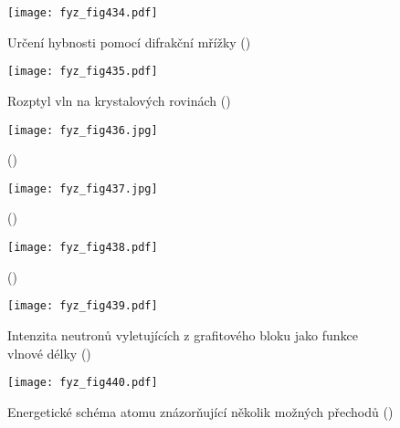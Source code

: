   \begin{figure}[ht!] %
    \centering
    \texttt{[image: fyz\_fig434.pdf]}
    \caption{Určení hybnosti pomocí difrakční mřížky
             (\cite[s.~513]{Feynman01})}
    \label{fyz:fig434}
  \end{figure}

  \begin{figure}[ht!] %
    \centering
    \texttt{[image: fyz\_fig435.pdf]}
    \caption{Rozptyl vln na krystalových rovinách
             (\cite[s.~514]{Feynman01})}
    \label{fyz:fig435}
  \end{figure}

  \begin{figure}[ht!] %
    \centering
    \texttt{[image: fyz\_fig436.jpg]}
    \caption{
             (\cite[s.~515]{Feynman01})}
    \label{fyz:fig436}
  \end{figure}

  \begin{figure}[ht!] %
    \centering
    \texttt{[image: fyz\_fig437.jpg]}
    \caption{
             (\cite[s.~515]{Feynman01})}
    \label{fyz:fig437}
  \end{figure}

  \begin{figure}[ht!] %
    \centering
    \texttt{[image: fyz\_fig438.pdf]}
    \caption{
             (\cite[s.~515]{Feynman01})}
    \label{fyz:fig438}
  \end{figure}

  \begin{figure}[ht!] %
    \centering
    \texttt{[image: fyz\_fig439.pdf]}
    \caption{Intenzita neutronů vyletujících z grafitového bloku jako funkce vlnové délky
             (\cite[s.~516]{Feynman01})}
    \label{fyz:fig439}
  \end{figure}

  \begin{figure}[ht!] %
    \centering
    \texttt{[image: fyz\_fig440.pdf]}
    \caption{Energetické schéma atomu znázorňující několik možných přechodů
             (\cite[s.~518]{Feynman01})}
    \label{fyz:fig440}
  \end{figure}
  
\printbibliography[title={Seznam literatury}, heading=subbibliography]
